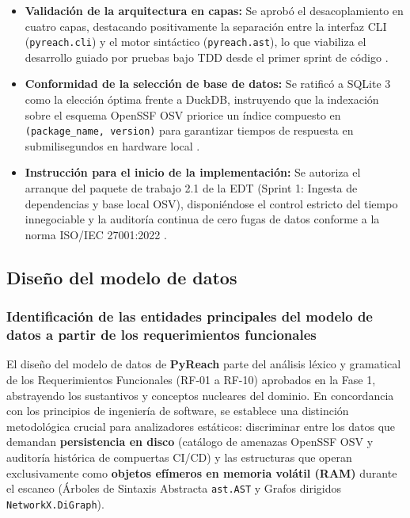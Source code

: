 \begin{itemize}
    \item \textbf{Validación de la arquitectura en capas:} Se aprobó el desacoplamiento en cuatro capas, destacando positivamente la separación entre la interfaz CLI (\texttt{pyreach.\allowbreak cli}) y el motor sintáctico (\texttt{pyreach.\allowbreak ast}), lo que viabiliza el desarrollo guiado por pruebas bajo TDD desde el primer sprint de código \cite{myers2011art, martin2017cleanarch}.
    \item \textbf{Conformidad de la selección de base de datos:} Se ratificó a SQLite 3 como la elección óptima frente a DuckDB, instruyendo que la indexación sobre el esquema OpenSSF OSV priorice un índice compuesto en \texttt{(package\_\allowbreak name, version)} para garantizar tiempos de respuesta en submilisegundos en hardware local \cite{openssf2023osv}.
    \item \textbf{Instrucción para el inicio de la implementación:} Se autoriza el arranque del paquete de trabajo 2.1 de la EDT (Sprint 1: Ingesta de dependencias y base local OSV), disponiéndose el control estricto del tiempo innegociable y la auditoría continua de cero fugas de datos conforme a la norma ISO/IEC 27001:2022 \cite{ladisa2023sok, gutierrez2024auditoria}.
\end{itemize}

\newpage


\clearpage

\subsection{Diseño del modelo de datos}
\subsubsection{Identificación de las entidades principales del modelo de datos a partir de los requerimientos funcionales}

El diseño del modelo de datos de \textbf{PyReach} parte del análisis léxico y gramatical de los Requerimientos Funcionales (RF-01 a RF-10) aprobados en la Fase 1, abstrayendo los sustantivos y conceptos nucleares del dominio. En concordancia con los principios de ingeniería de software, se establece una distinción metodológica crucial para analizadores estáticos: discriminar entre los datos que demandan \textbf{persistencia en disco} (catálogo de amenazas OpenSSF OSV y auditoría histórica de compuertas CI/CD) y las estructuras que operan exclusivamente como \textbf{objetos efímeros en memoria volátil (RAM)} durante el escaneo (Árboles de Sintaxis Abstracta \texttt{ast.\allowbreak AST} y Grafos dirigidos \texttt{NetworkX.\allowbreak DiGraph}).

